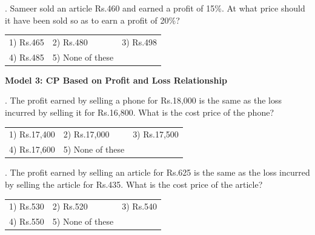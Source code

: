 \documentclass{article}
\begin{document}
	\noindent 
	
	\noindent 
	
	\noindent 
	
	. Sameer sold an article Rs.460 and earned a profit of 15\%. At what price should it have been sold so as to earn a profit of 20\%?
	
	\noindent  
	\begin{tabular}{p{1.7in} p{1.6in} p{1.6in}} \\ 
 1) Rs.465                 & 2) Rs.480          & 3) Rs.498          \\
4) Rs.485          & 5) None of these  \\
\end{tabular}
	
	\noindent 
	
	\noindent 
	
	\noindent 
	
	\noindent 
	
	\noindent 
	
	\noindent \textbf{Model 3: CP Based on Profit and Loss Relationship}
	
	\noindent 
	
	. The profit earned by selling a phone for Rs.18,000 is the same as the loss incurred by selling it for Rs.16,800. What is the cost price of the phone?
	
	\noindent  
	\begin{tabular}{p{1.7in} p{1.6in} p{1.6in}} \\ 
 1) Rs.17,400                         & 2) Rs.17,000     & 3) Rs.17,500     \\
4) Rs.17,600     & 5) None of these  \\
\end{tabular}
	
	\noindent 
	
	\noindent 
	
	\noindent 
	
	. The profit earned by selling an article for Rs.625 is the same as the loss incurred by selling the article for Rs.435. What is the cost price of the article?
	
	\noindent  
	\begin{tabular}{p{1.7in} p{1.6in} p{1.6in}} \\ 
 1) Rs.530                 & 2) Rs.520          & 3) Rs.540          \\
4) Rs.550          & 5) None of these  \\
\end{tabular}
	
\end{document}
